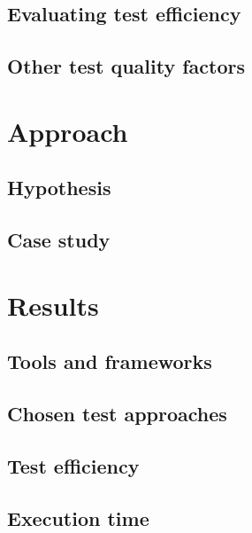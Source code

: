\documentclass[a4paper]{report}
\begin{document}
  \section{Evaluating test efficiency}
    \label{sec:efficiency}
    


  \section{Other test quality factors}
    \label{sec:quality}
    


\chapter{Approach}

  

  \section{Hypothesis}
  \label{sec:hypothesis}
  

  \section{Case study}
  


\chapter{Results}
\label{chap:results}

  

  \section{Tools and frameworks}

  \section{Chosen test approaches}

  \section{Test efficiency}
  

  \section{Execution time}
  
\end{document}

